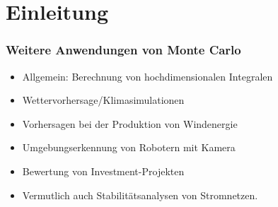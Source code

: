 \documentclass{beamer}
\begin{document}
\section{Einleitung}
\begin{frame}
\frametitle{Weitere Anwendungen von Monte Carlo}
\begin{itemize}
\item Allgemein: Berechnung von hochdimensionalen Integralen
\item Wettervorhersage/Klimasimulationen
\item Vorhersagen bei der Produktion von Windenergie
\item Umgebungserkennung von Robotern mit Kamera
\item Bewertung von Investment-Projekten
\item Vermutlich auch Stabilitätsanalysen von Stromnetzen. 
\end{itemize}
\end{frame}
\end{document}
